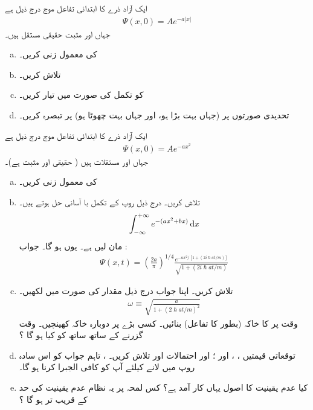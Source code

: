 ایک آزاد ذرے کا ابتدائی تفاعل موج درج ذیل ہے 
\begin{align*}
\Psi (x,0) = Ae^{ -a \left| x \right| } 
\end{align*}
جہاں  اور  مثبت حقیقی مستقل ہیں۔
\begin{enumerate}[a.]
\item 
{} کی معمول زنی کریں۔ 
\item
{} تلاش کریں۔ 
\item
{} کو تکمل کی صورت میں تیار کریں۔ 
\item
تحدیدی صورتوں پر (جہاں  بہت بڑا ہو، اور جہاں  بہت چھوٹا ہو) پر تبصرہ کریں۔ 
\end{enumerate}
 \quad {}
 ایک آزاد ذرے کا ابتدائی تفاعل موج درج ذیل ہے
\begin{align*}
\Psi(x,0) = A e^{-ax^{2}}
\end{align*}
جہاں  اور  مستقلات ہیں ( حقیقی اور مثبت ہے)۔ 
\begin{enumerate}[a.]
\item
{} کی معمول زنی کریں۔ 
\item
{} تلاش کریں۔   درج ذیل روپ کے تکمل با آسانی حل ہوتے ہیں۔ 
\begin{align*}
\int_{-\infty}^{+\infty} e^{-(ax^{2} +bx)} \dif x
\end{align*}
مان لیں  ہے۔ یوں  ہو گا۔ جواب : 
\begin{align*}
\Psi(x,t) = \left( \frac{2a}{\pi} \right) ^{1/4} \frac{e^{-ax^{2}/[1+(2i\hslash at/m)]}}{\sqrt{1+(2i\hslash at/m)}}
\end{align*}
\item
{} تلاش کریں۔ اپنا جواب درج ذیل مقدار کی صورت میں لکھیں۔ 
\begin{align*}
\omega \equiv \sqrt{\frac{a}{1+(2\hslash at/m)^{2}}}
\end{align*}
وقت  پر  کا خاکہ (بطور  کا تفاعل) بنائیں۔ کسی بڑے  پر دوبارہ خاکہ کھینچیں۔ وقت گزرنے کے ساتھ ساتھ  کو کیا ہو گا ؟
\item 
توقعاتی قیمتیں ، ،  اور ؛ اور احتمالات  اور  تلاش کریں۔
  ، تاہم جواب کو اس سادہ روپ میں لانے کیلئے آپ کو کافی الجبرا کرنا ہو گا۔ 
\item
کیا عدم یقینیت کا اصول یہاں کار آمد ہے؟ کس لمحہ  پر یہ نظام عدم یقینیت کی حد کے قریب تر ہو گا ؟
\end{enumerate}

